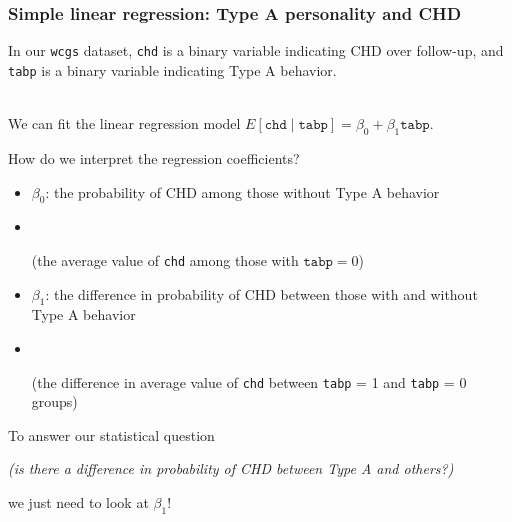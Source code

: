 \documentclass[10pt,t]{beamer}
\begin{document}
\begin{frame}
	\frametitle{Simple linear regression: Type A personality and CHD}
	\vspace{-0.5cm}
	In our \texttt{wcgs} dataset, \texttt{chd} is a binary variable indicating CHD over follow-up, and \texttt{tabp} is a binary variable indicating Type A behavior. 
	\\ ~\
	
	We can fit the linear regression model $E[\texttt{chd} \mid \texttt{tabp}] = \beta_0 + \beta_1\texttt{tabp} $.
	
	How do we interpret the regression coefficients? \vspace{-0.2cm}
	
	\begin{itemize}
		\item \color{blue} $\beta_0$: \pause the probability of CHD among those without Type A behavior \pause \color{black}\vspace{-0.2cm}
		\item[] \ \ \begin{scriptsize} (the average value of \texttt{chd} among those with $\texttt{tabp} = 0$) \end{scriptsize} \pause
		\item \color{blue} $\beta_1$: \pause the difference in probability of CHD between those with and without Type A behavior \pause \color{black} \vspace{-0.2cm}
		\item[] \ \ \begin{scriptsize}(the difference in average value of \texttt{chd} between \texttt{tabp} = 1 and \texttt{tabp} = 0 groups) \pause \end{scriptsize}
	\end{itemize}
	
	\vspace{-0.2cm}
	To answer our statistical question \begin{small}\textit{(is there a difference in probability of CHD between Type A and others?)}\end{small} we just need to look at $\beta_1$!
\end{frame}
\end{document}
